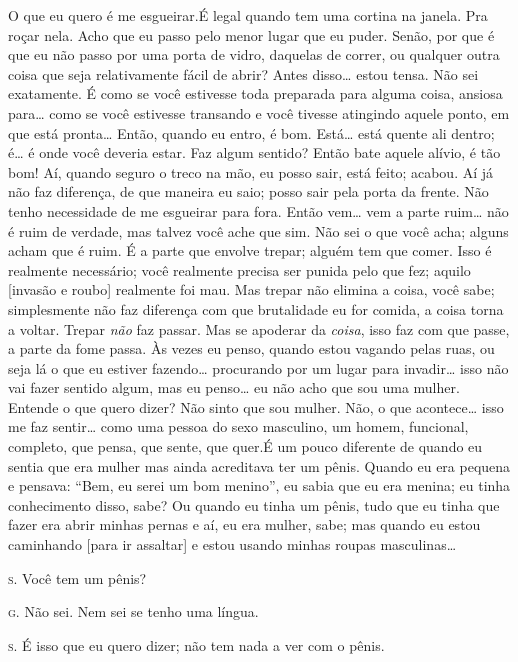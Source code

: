 O que eu quero é me esgueirar.\idxidenhis[|(] É legal quando tem uma cortina na
janela. Pra roçar nela. Acho que eu passo pelo menor lugar que eu
puder. Senão, por que é que eu não passo por uma porta de vidro,
daquelas de correr, ou qualquer outra coisa que seja relativamente
fácil de abrir? Antes disso\ldots{} estou tensa. Não sei exatamente. É como
se você estivesse toda preparada para alguma coisa, ansiosa para\ldots{}
como se você estivesse transando e você tivesse atingindo aquele ponto,
em que está pronta\ldots{} Então, quando eu entro, é bom. Está\ldots{} está
quente ali dentro; é\ldots{} é onde você deveria estar. Faz algum sentido?
Então bate aquele alívio, é tão bom! Aí, quando seguro o treco na mão,
eu posso sair, está feito; acabou. Aí já não faz diferença, de que
maneira eu saio; posso sair pela porta da frente. Não tenho necessidade
de me esgueirar para fora. Então vem\ldots{} vem a parte ruim\ldots{} não é ruim
de verdade, mas talvez você ache que sim. Não sei o que você acha;
alguns acham que é ruim. É a parte que envolve trepar; alguém tem que
comer. Isso é realmente necessário; você realmente precisa ser punida
pelo que fez; aquilo [invasão e roubo] realmente foi mau. Mas trepar
não elimina a coisa, você sabe; simplesmente não faz diferença com que
brutalidade eu for comida, a coisa torna a voltar. Trepar \textit{não}
faz passar. Mas se apoderar da \textit{coisa}, isso faz com que passe,
a parte da fome passa. Às vezes eu penso, quando estou vagando pelas
ruas, ou seja lá o que eu estiver fazendo\ldots{} procurando por um lugar
para invadir\ldots{} isso não vai fazer sentido algum, mas eu penso\ldots{} eu
não acho que sou uma mulher. Entende o que quero dizer? Não sinto que
sou mulher. Não, o que acontece\ldots{} isso me faz sentir\ldots{} como uma
pessoa do sexo masculino, um homem, funcional, completo, que pensa, que
sente, que quer.\idxiden[|(] É um pouco diferente de quando eu sentia que era
mulher mas ainda acreditava ter um pênis. Quando eu era pequena e
pensava: ``Bem, eu serei um bom menino'', eu
sabia que eu era menina; eu tinha conhecimento disso, sabe? Ou quando
eu tinha um pênis, tudo que eu tinha que fazer era abrir minhas pernas
e aí, eu era mulher, sabe; mas quando eu estou caminhando [para ir
assaltar] e estou usando minhas roupas masculinas\ldots{}

\noindent\hskip0mm\textsc{s.} Você tem um pênis?\idxpenisimag{}

\noindent\hskip0mm\textsc{g.} Não sei. Nem sei se tenho uma língua.

\noindent\hskip0mm\textsc{s.} É isso que eu quero dizer; não tem nada a ver com o pênis.

